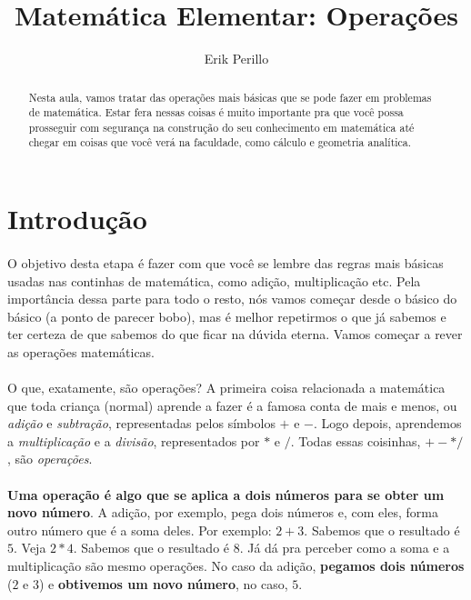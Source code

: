 \documentclass{article}
\begin{document}
\title{Matemática Elementar: Operações}
\author{Erik Perillo}
\maketitle

\begin{abstract}
Nesta aula, vamos tratar das operações mais básicas que se pode fazer em 
problemas de matemática. Estar fera nessas coisas é muito importante pra 
que você possa prosseguir com segurança na construção do seu conhecimento em
matemática até chegar em coisas que você verá na faculdade, como cálculo e 
geometria analítica.
\end{abstract}

\newpage

\tableofcontents

\newpage

\section{Introdução}
\paragraph{}
O objetivo desta etapa é fazer com que você se lembre das regras mais básicas
usadas nas continhas de matemática, como adição, multiplicação etc. 
Pela importância dessa parte para todo o resto, nós vamos começar 
desde o básico do básico (a ponto de parecer bobo), mas é melhor repetirmos 
o que já sabemos e ter certeza de que sabemos do que ficar na dúvida eterna.
Vamos começar a rever as operações matemáticas.
\paragraph{}
O que, exatamente, são operações?
A primeira coisa relacionada a matemática que toda criança (normal) aprende a
fazer é a famosa conta de mais e menos, ou \textit{adição} e \textit{subtração}, 
representadas pelos símbolos $+$ e $-$. Logo depois, aprendemos a 
\textit{multiplicação} e a \textit{divisão}, representados por $*$ e $/$. Todas
essas coisinhas, $+ - * /$, são \textit{operações}. 
\paragraph{}
\textbf{Uma operação é algo que se aplica a dois números para se obter um novo
número}. A adição, por exemplo, pega dois números e, com eles, forma outro 
número que é a soma deles. Por exemplo: $2 + 3$. Sabemos que o resultado é $5$.
Veja $2*4$. Sabemos que o resultado é $8$. Já dá pra perceber como a soma e a 
multiplicação são mesmo operações. No caso da adição, \textbf{pegamos dois 
números} ($2$ e $3$) e \textbf{obtivemos um novo número}, no caso, $5$. 
\end{document}
